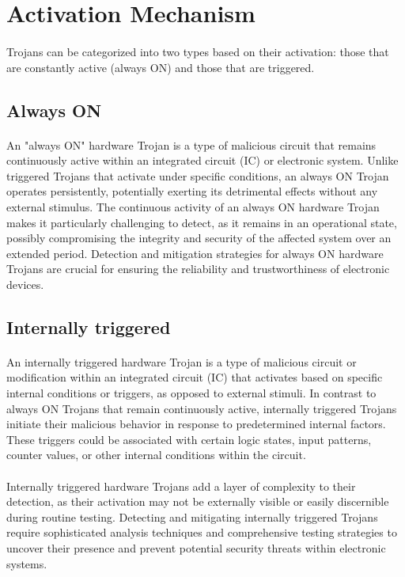 \section{Activation Mechanism}
\paragraph*{}
Trojans can be categorized into two types based on their activation: those that are constantly active (always ON) and those that are triggered.

\subsection{Always ON}
\paragraph*{}
An "always ON" hardware Trojan is a type of malicious circuit that remains continuously active within an integrated circuit (IC) or electronic system. Unlike triggered Trojans that activate under specific conditions, an always ON Trojan operates persistently, potentially exerting its detrimental effects without any external stimulus. The continuous activity of an always ON hardware Trojan makes it particularly challenging to detect, as it remains in an operational state, possibly compromising the integrity and security of the affected system over an extended period. Detection and mitigation strategies for always ON hardware Trojans are crucial for ensuring the reliability and trustworthiness of electronic devices.
\subsection{Internally triggered}
\paragraph*{}
An internally triggered hardware Trojan is a type of malicious circuit or modification within an integrated circuit (IC) that activates based on specific internal conditions or triggers, as opposed to external stimuli. In contrast to always ON Trojans that remain continuously active, internally triggered Trojans initiate their malicious behavior in response to predetermined internal factors. These triggers could be associated with certain logic states, input patterns, counter values, or other internal conditions within the circuit.
\paragraph*{}
Internally triggered hardware Trojans add a layer of complexity to their detection, as their activation may not be externally visible or easily discernible during routine testing. Detecting and mitigating internally triggered Trojans require sophisticated analysis techniques and comprehensive testing strategies to uncover their presence and prevent potential security threats within electronic systems.
